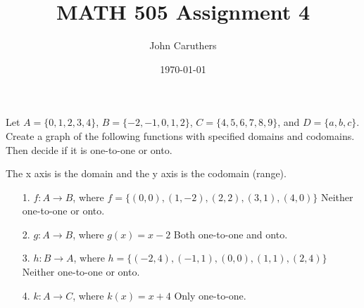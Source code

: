 \documentclass{article}
\title{MATH 505 Assignment 4}
\author{John Caruthers}
\date\today
\begin{document}
\maketitle

\noindent
Let $A=\{0,1,2,3,4\}$, $B=\{-2,-1,0,1,2\}$, $C=\{4,5,6,7,8,9\}$, and $D=\{a,b,c\}$.  Create a graph of the following functions with specified domains and codomains.  Then decide if it is one-to-one or onto.

\noindent
{\color{blue} The x axis is the domain and the y axis is the codomain (range).}

\begin{itemize}
    \item[1.] $f:A \to B$, where $f=\{(0,0),(1,-2),(2,2),(3,1),(4,0)\}$ {\color{blue} Neither one-to-one or onto.}
    
    
    \item[2.] $g:A \to B$, where $g(x)=x-2$
    {\color{blue} Both one-to-one and onto.}
    
    
    \newpage
    
    \item[3.] $h:B \to A$, where $h=\{(-2,4),(-1,1),(0,0),(1,1),(2,4)\}${\color{blue} Neither one-to-one or onto.}
    
    
    \item[4.] $k:A \to C$, where $k(x)=x+4$ {\color{blue} Only one-to-one.}
    

\end{itemize}
\end{document}
